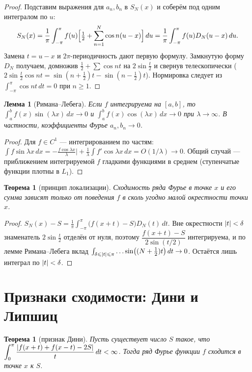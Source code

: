 \documentclass[11pt,a4paper]{article}
\theoremstyle{definition}
\theoremstyle{plain}
\newtheorem{theorem}[definition]{Теорема}
\newtheorem{lemma}[definition]{Лемма}
\newcommand{\dx}{\,dx}
\newcommand{\dt}{\,dt}
\newcommand{\du}{\,du}
\renewcommand{\le}{\leqslant}
\renewcommand{\ge}{\geqslant}
\DeclarePairedDelimiter{\abs}{\lvert}{\rvert}
\begin{document}
\begin{proof}
Подставим выражения для $a_n,b_n$ в $S_N(x)$ и соберём под одним интегралом по $u$:
\[
  S_N(x)=\frac1\pi\int_{-\pi}^{\pi}f(u)\Bigl[\tfrac12+\sum_{n=1}^N\cos n(u-x)\Bigr]\du
   =\frac1\pi\int_{-\pi}^{\pi}f(u)D_N(u-x)\du .
\]
Замена $t=u-x$ и $2\pi$-периодичность дают первую формулу. Замкнутую форму $D_N$ получаем,
домножив $\tfrac12+\sum\cos nt$ на $2\sin\tfrac t2$ и свернув телескопически
($2\sin\tfrac t2\cos nt=\sin(n+\tfrac12)t-\sin(n-\tfrac12)t$). Нормировка следует из
$\int_{-\pi}^{\pi}\cos nt\dt=0$ при $n\ge1$.
\end{proof}

\begin{lemma}[Римана--Лебега]
Если $f$ интегрируема на $[a,b]$, то
$\displaystyle\int_a^b f(x)\sin(\lambda x)\dx\to0$ и $\displaystyle\int_a^b f(x)\cos(\lambda x)\dx\to0$
при $\lambda\to\infty$. В частности, коэффициенты Фурье $a_n,b_n\to0$.
\end{lemma}

\begin{proof}
Для $f\in C^1$ — интегрированием по частям: $\int f\sin\lambda x\dx
=-\tfrac{f\cos\lambda x}{\lambda}\big|+\tfrac1\lambda\int f'\cos\lambda x\dx=O(1/\lambda)\to0$.
Общий случай — приближением интегрируемой $f$ гладкими функциями в среднем (ступенчатые функции
плотны в $L_1$).
\end{proof}

\begin{theorem}[принцип локализации]
Сходимость ряда Фурье в точке $x$ и его сумма зависят только от поведения $f$ в сколь угодно малой
окрестности точки $x$.
\end{theorem}

\begin{proof}
$S_N(x)-S=\tfrac1\pi\int_{-\pi}^{\pi}\bigl(f(x+t)-S\bigr)D_N(t)\dt$. Вне окрестности $\abs t<\delta$
знаменатель $2\sin\tfrac t2$ отделён от нуля, поэтому
$\dfrac{f(x+t)-S}{2\sin(t/2)}$ интегрируема, и по лемме Римана--Лебега вклад
$\int_{\delta\le\abs t\le\pi}\dots\sin\bigl((N+\tfrac12)t\bigr)\dt\to0$. Остаётся лишь интеграл по
$\abs t<\delta$.
\end{proof}

\section{Признаки сходимости: Дини и Липшиц}

\begin{theorem}[признак Дини]
Пусть существует число $S$ такое, что
$\displaystyle\int_0^{\pi}\frac{\abs{f(x+t)+f(x-t)-2S}}{t}\dt<\infty$.
Тогда ряд Фурье функции $f$ сходится в точке $x$ к $S$.
\end{theorem}
\end{document}
